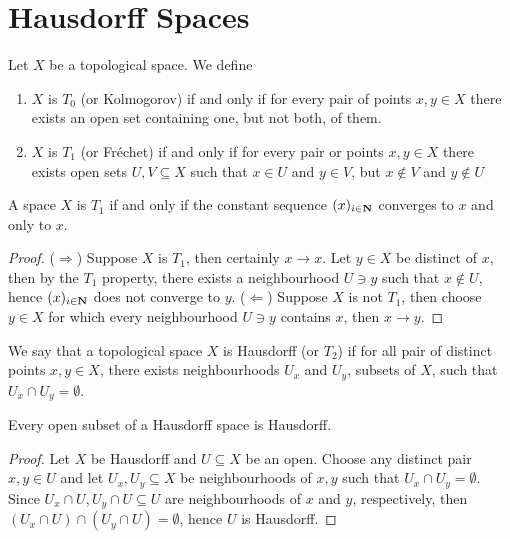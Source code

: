 \section{Hausdorff Spaces}

\begin{definition}
Let \(X\) be a topological space. We define
\begin{enumerate}[(1)]
\item\label{def:T0-space-kolmogorov}
  \(X\) is \(T_0\) (or Kolmogorov) if and only if for every pair of points
  \(x, y \in X\) there exists an open set containing one, but not both, of them.
\item\label{def:T1-space-frechet}
    \(X\) is \(T_1\) (or Fréchet) if and only if for every pair or points
    \(x, y \in X\) there exists open sets \(U, V \subseteq X\) such that \(x
    \in U\) and \(y \in V\), but \(x \not\in V\) and \(y \not\in U\)
\end{enumerate}
\end{definition}

\begin{proposition}
A space \(X\) is \(T_1\) if and only if the constant sequence \((x)_{i \in
\mathbf{N}}\) converges to \(x\) and only to \(x\).
\end{proposition}

\begin{proof}
(\(\Rightarrow\)) Suppose \(X\) is \(T_1\), then certainly \(x \to x\). Let
\(y \in X\) be distinct of \(x\), then by the \(T_1\) property, there exists a
neighbourhood \(U \ni y\) such that \(x \not\in U\), hence \((x)_{i \in
\mathbf{N}}\) does not converge to \(y\). (\(\Leftarrow\)) Suppose \(X\) is
not \(T_1\), then choose \(y \in X\) for which every neighbourhood \(U \ni y\)
contains \(x\), then \(x \to y\).
\end{proof}

\begin{definition}\label{def: Hausdorff space}
We say that a topological space \(X\) is Hausdorff (or \(T_2\)) if for all
pair of distinct points \(x, y \in X\), there exists neighbourhoods \(U_x\)
and \(U_y\), subsets of \(X\), such that \(U_x \cap U_y = \emptyset\).
\end{definition}

\begin{corollary}
Every open subset of a Hausdorff space is Hausdorff.
\end{corollary}

\begin{proof}
Let \(X\) be Hausdorff and \(U \subseteq X\) be an open. Choose any
distinct pair \(x, y \in U\) and let \(U_x, U_y \subseteq X\) be neighbourhoods
of \(x, y\) such that \(U_x \cap U_y = \emptyset\). Since \(U_x \cap U, U_y
\cap U \subseteq U\) are neighbourhoods of \(x\) and \(y\), respectively, then
\((U_x \cap U) \cap (U_y \cap U) = \emptyset\), hence \(U\) is Hausdorff.
\end{proof}

